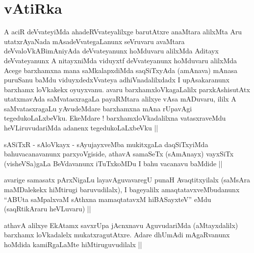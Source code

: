 \section*{vAtiRka}


\begin{artha}
A aciR deVvateyiMda ahadeRVvateyalilxge barutAtxre anaMtara alilxMta
Aru utatxrAyaNada mAsadeVvategaLanunx seVruvaru avaMtara
deVvaloVkABimAniyAda deVvateyanunx hoMduvaru alilxMda Aditayx
deVvateyanunx A nitayxniMda viduyxtf deVvateyanunx hoMduvaru alilxMda
Acege barxhamxna mana saMkalapxdiMda saqSiTxyAda (amAnava) mAnasa
puruSanu baMdu viduyxdedxVvateya adhiVnadalilxdadx I upAsakaranunx
barxhamx loVkakekx oyuyxvanu. avaru barxhamxloVkagaLalilx
parxkAshisutAtx utatxmavAda saMvatasxragaLa payaRMtara alilxye vAsa
mADuvaru, ililx A saMvatasxragaLu yAvudeMdare  barxhamxna mAna
rUpavAgi tegedukoLaLxbeVku. EkeMdare ! barxhamxloVkadalilxna
vatasxraveMdu heVLiruvudariMda adanenx tegedukoLaLxbeVku || 
\end{artha}


\begin{artha}
sASiTxR - sAloVkayx - sAyujayxveMba mukitxgaLa daqSiTxyiMda
bahuvacanavanunx parxyoVgiside, athavA samaSeTx (sAmAnayx) vayxSiTx
(visheVSa)gaLa BeVdavanunx iTuTxkoMDu I bahu vacanavu baMdide ||
\end{artha}


\begin{artha}
avarige samasatx pArxNigaLu layavAguvavaregU punaH Avaqtitxyilalx
(saMsAra maMDalekekx hiMtirugi baruvudilalx), I bageyalilx
amaqtatavxveMbudanunx ``ABUta saMpalxvaM sAthxna mamaqtatavxM
hiBASayxteV'' eMdu (saqRtikAraru heVLuvaru) ||
\end{artha}


\begin{artha}
athavA alilxye EkAtamx savxrUpa jAcnxnavu AguvudariMda (aMtayxdalilx)
barxhamx loVkadalelx mukatxragutAtxre. Adare dhUmAdi mAgaRvanunx
hoMdida kamiRgaLaMte hiMtiruguvudilalx ||
\end{artha}


